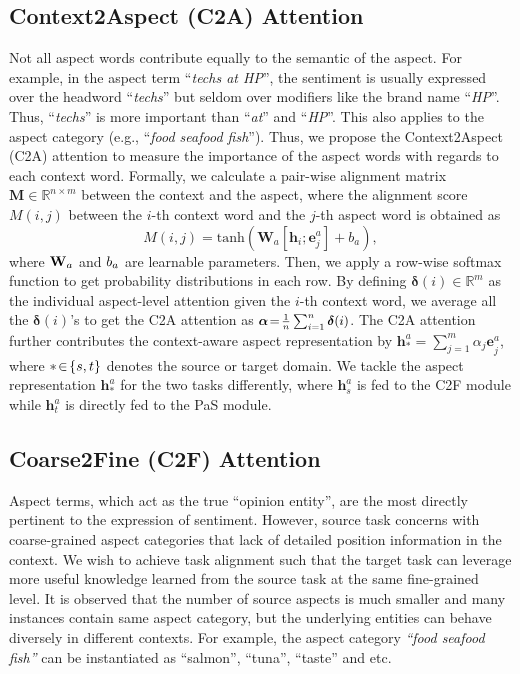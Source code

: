 \documentclass[letterpaper]{article} \usepackage{aaai19}  \usepackage{times}  \usepackage{latexsym}
\begin{document}
\subsection{Context2Aspect (C2A) Attention}
\label{catr}
Not all aspect words contribute equally to the semantic of the aspect. For example, in the aspect term ``{\it techs at HP}'', the sentiment is usually expressed over the headword ``{\it techs}'' but seldom over modifiers like the brand name ``{\it HP}''. Thus, ``{\it techs}'' is more important than ``{\it at}'' and ``{\it HP}''. This also applies to the aspect category (e.g., ``{\it food seafood fish}''). Thus, we propose the Context2Aspect (C2A) attention to measure the importance of the aspect words with regards to each context word. Formally, we calculate a pair-wise alignment matrix $\mathbf{M}\!\in\! \mathbb{R}^{n \!\times\! m}$ between the context and the aspect, where the alignment score $M(i,j)$ between the $i$-th context word and the $j$-th aspect word is obtained as
\begin{equation}
M(i,j)=\mathrm{tanh}({ { { \mathbf{W} } } }_{a}[{ \mathbf{h} }_{ i};{ { \mathbf{e} } }^{a}_{ j }]+{ b }_{ a }),
\end{equation}
where $\small{{ \mathbf{W} }_{ a }}$ and $\small{{b}_{a}}$ are learnable parameters. Then, we apply a row-wise softmax function to get probability distributions in each row. By defining ${ \bm{\delta }  }(i)\!\in\!\mathbb{R}^{m}$ as the individual aspect-level attention given the $i$-th context word, we average all the ${ \bm{\delta }  }(i)$'s to get the C2A attention as $\small{\bm{{\alpha}}\!=\!\frac { 1 }{ n } \sum _{ i=1 }^{n }{ \bm{\delta }(i)} } $. The C2A attention further contributes the context-aware aspect representation by ${ \mathbf{h} }^{ a }_{*}\!=\!\sum _{ j=1 }^{ m }{ { { {\alpha}  }_{j} \mathbf{e} }_{ j }^{ a  } }$, where $\small{*\!\in\!\{s,t\}}$ denotes the source or target domain. We tackle the aspect representation ${ \mathbf{h} }^{ a }_{*}$ for the two tasks differently, where ${ \mathbf{h} }^{ a }_{s}$ is fed to the C2F module while ${ \mathbf{h} }^{ a }_{t}$ is directly fed to the PaS module.





\subsection{Coarse2Fine (C2F) Attention}
Aspect terms, which act as the true ``opinion entity'', are the most directly pertinent to the expression of sentiment. However, source task concerns with coarse-grained aspect categories that lack of detailed position information in the context. We wish to achieve task alignment such that the target task can leverage more useful knowledge learned from the source task at the same fine-grained level. It is observed that the number of source aspects is much smaller and many instances contain same aspect category, but the underlying entities can behave diversely in different contexts. For example, the aspect category {\it ``food seafood fish''} can be instantiated as ``salmon'', ``tuna'', ``taste'' and etc. 
\end{document}
